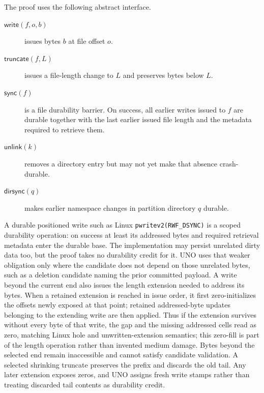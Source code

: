 \documentclass[10pt,twocolumn]{article}
\theoremstyle{remark}
\newcommand{\code}[1]{\texttt{#1}}
\newcommand{\sync}{\mathsf{sync}}
\newcommand{\dirsync}{\mathsf{dirsync}}
\newcommand{\unlink}{\mathsf{unlink}}
\begin{document}
The proof uses the following abstract interface.
\begin{description}
  \item[$\mathsf{write}(f,o,b)$] issues bytes $b$ at file offset $o$.
  \item[$\mathsf{truncate}(f,L)$] issues a file-length change to $L$ and preserves bytes below $L$.
  \item[$\sync(f)$] is a file durability barrier. On success, all earlier writes issued to $f$ are
  durable together with the last earlier issued file length and the metadata required to retrieve
  them.
  \item[$\unlink(k)$] removes a directory entry but may not yet make that absence crash-durable.
  \item[$\dirsync(q)$] makes earlier namespace changes in partition directory $q$ durable.
\end{description}
A durable positioned write such as Linux \code{pwritev2(RWF\_DSYNC)} is a scoped durability
operation: on success at least its addressed bytes and required retrieval metadata enter the durable
base. The implementation may persist unrelated dirty data too, but the proof takes no durability
credit for it. UNO uses that weaker obligation only where the candidate does not depend on those
unrelated bytes, such as a deletion candidate naming the prior committed payload.
A write beyond the current end also issues the length extension needed to address its bytes. When a
retained extension is reached in issue order, it first zero-initializes the offsets newly exposed at
that point; retained addressed-byte updates belonging to the extending write are then applied. Thus
if the extension survives without every byte of that write, the gap and the missing addressed cells
read as zero, matching Linux hole and unwritten-extension semantics; this zero-fill is part of the
length operation rather than invented medium damage. Bytes beyond the selected end remain
inaccessible and cannot satisfy candidate validation. A selected shrinking truncate preserves the
prefix and discards the old tail. Any later extension exposes zeros, and UNO assigns fresh write
stamps rather than treating discarded tail contents as durability credit.
\end{document}
